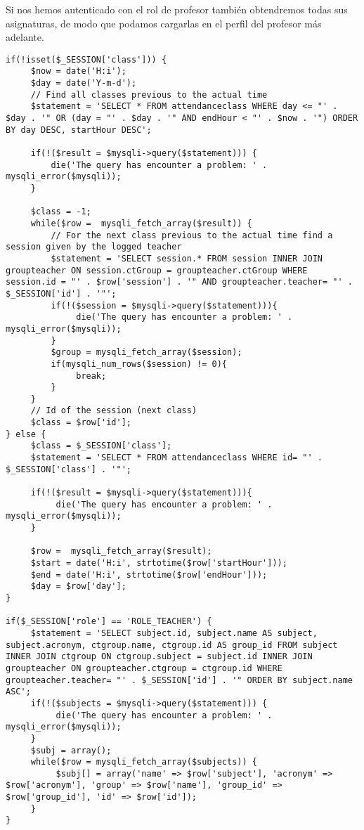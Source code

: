 Si nos hemos autenticado con el rol de profesor también obtendremos todas sus asignaturas, de modo que podamos cargarlas en el perfil del profesor más adelante.\\

\noindent
\begin{lstlisting}[caption=Obtener información inicial para la carga de la interfaz.,label={lst:get-data}]
if(!isset($_SESSION['class'])) {
     $now = date('H:i');
     $day = date('Y-m-d');
     // Find all classes previous to the actual time
     $statement = 'SELECT * FROM attendanceclass WHERE day <= "' . $day . '" OR (day = "' . $day . '" AND endHour < "' . $now . '") ORDER BY day DESC, startHour DESC';
		
     if(!($result = $mysqli->query($statement))) {
         die('The query has encounter a problem: ' . mysqli_error($mysqli));
     }
		
     $class = -1;
     while($row =  mysqli_fetch_array($result)) {
         // For the next class previous to the actual time find a session given by the logged teacher
         $statement = 'SELECT session.* FROM session INNER JOIN groupteacher ON session.ctGroup = groupteacher.ctGroup WHERE session.id = "' . $row['session'] . '" AND groupteacher.teacher= "' . $_SESSION['id'] . '"';
         if(!($session = $mysqli->query($statement))){
		      die('The query has encounter a problem: ' . mysqli_error($mysqli));
         }
         $group = mysqli_fetch_array($session);
         if(mysqli_num_rows($session) != 0){
              break;
         }
     }
     // Id of the session (next class)
     $class = $row['id'];
} else {
     $class = $_SESSION['class'];
     $statement = 'SELECT * FROM attendanceclass WHERE id= "' . $_SESSION['class'] . '"';
	  
     if(!($result = $mysqli->query($statement))){
          die('The query has encounter a problem: ' . mysqli_error($mysqli));
     }

     $row =  mysqli_fetch_array($result);
     $start = date('H:i', strtotime($row['startHour']));
     $end = date('H:i', strtotime($row['endHour']));
     $day = $row['day'];
}

if($_SESSION['role'] == 'ROLE_TEACHER') {
     $statement = 'SELECT subject.id, subject.name AS subject, subject.acronym, ctgroup.name, ctgroup.id AS group_id FROM subject INNER JOIN ctgroup ON ctgroup.subject = subject.id INNER JOIN groupteacher ON groupteacher.ctgroup = ctgroup.id WHERE groupteacher.teacher= "' . $_SESSION['id'] . '" ORDER BY subject.name ASC';
     if(!($subjects = $mysqli->query($statement))) {
	      die('The query has encounter a problem: ' . mysqli_error($mysqli));
     }
     $subj = array();
     while($row = mysqli_fetch_array($subjects)) {
          $subj[] = array('name' => $row['subject'], 'acronym' => $row['acronym'], 'group' => $row['name'], 'group_id' => $row['group_id'], 'id' => $row['id']);
     }
}
\end{lstlisting}

